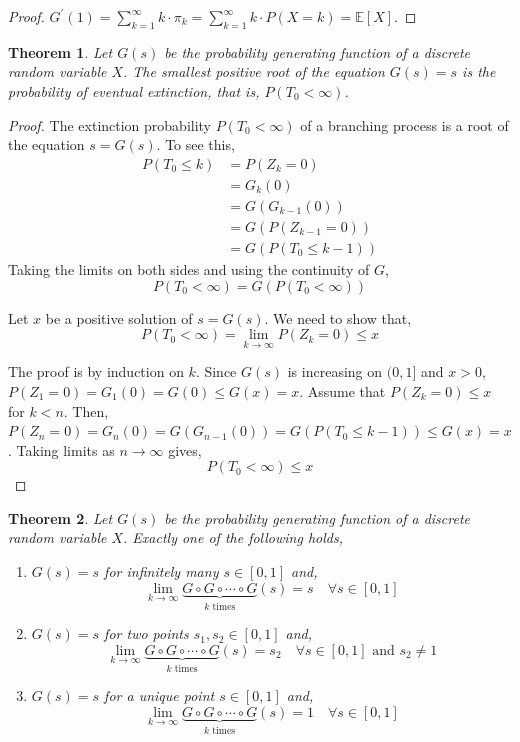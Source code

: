 \documentclass{tufte-handout}
\newtheorem{thm}{Theorem}
\begin{document}
\begin{proof}
  $G^{\prime}(1) = \sum_{k=1}^{\infty} k \cdot \pi_k = \sum_{k=1}^{\infty} k \cdot P(X = k) = \mathbb{E}[X]$.
\end{proof}

\begin{thm}
  Let $G(s)$ be the probability generating function of a discrete random variable $X$. The smallest positive root of the equation $G(s) = s$ is the probability of eventual extinction, that is, $P(T_0 < \infty)$.
\end{thm}

\begin{proof}
  The extinction probability $P(T_0 < \infty)$ of a branching process is a root of the equation $s = G(s)$. To see this, 
  \begin{align*}
    P(T_0 \leq k) &= P(Z_k = 0) \\
                  &= G_k(0) \\
                  &= G(G_{k-1}(0)) \\
                  &= G(P(Z_{k-1}=0)) \\
                  &= G(P(T_0 \leq k - 1))
  \end{align*}
  \noindent Taking the limits on both sides and using the continuity of $G$,
  \[P(T_0 < \infty) = G(P(T_0 < \infty))\]

  \noindent Let $x$ be a positive solution of $s = G(s)$. We need to show that,
  \[P(T_0 < \infty) = \lim_{k \rightarrow \infty} P(Z_k = 0) \leq x\]

  \noindent The proof is by induction on $k$. Since $G(s)$ is increasing on $(0,1]$ and $x > 0$, $P(Z_1 = 0) = G_1(0) = G(0) \leq G(x) = x$. Assume that $P(Z_k = 0) \leq x$ for $k < n$. Then, $P\left(Z_{n}=0\right)=G_{n}(0)=G\left(G_{n-1}(0)\right)=G\left(P(T_0 \leq k - 1)\right) \leq G(x)=x$. Taking limits as $n \rightarrow \infty$ gives,
  \[P(T_0 < \infty) \leq x\]
\end{proof}

\begin{thm}
  Let $G(s)$ be the probability generating function of a discrete random variable $X$. Exactly one of the following holds,
  \begin{enumerate}
    \item $G(s) = s$ for infinitely many $s \in [0,1]$ and,
    \[\lim_{k \rightarrow \infty} \underbrace{G \circ G \circ \cdots \circ G}_{k \text{ times}}(s) = s \quad \forall s \in [0,1]\]
    \item $G(s) = s$ for two points $s_1, s_2 \in [0,1]$ and,
    \[\lim_{k \rightarrow \infty} \underbrace{G \circ G \circ \cdots \circ G}_{k \text{ times}}(s) = s_2 \quad \forall s \in [0,1] \text{ and } s_2 \neq 1\]
    \item $G(s) = s$ for a unique point $s \in [0,1]$ and,
    \[\lim_{k \rightarrow \infty} \underbrace{G \circ G \circ \cdots \circ G}_{k \text{ times}}(s) = 1 \quad \forall s \in [0,1]\]
  \end{enumerate}
\end{thm}
\end{document}
